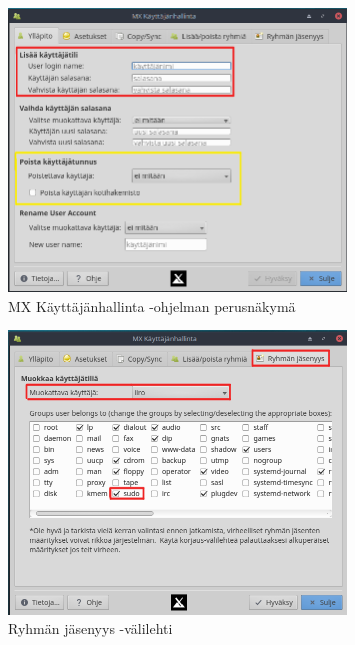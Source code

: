 \documentclass[a4paper, 12pt, finnish]{article}
\begin{document}
\begin{figure}[htpb]
    \begin{center}
        \includegraphics[width=0.8\textwidth]{user/nakyma}
        \caption{MX Käyttäjänhallinta -ohjelman perusnäkymä}
        \label{fig:usernak}
    \end{center}
\end{figure}
\begin{figure}[htpb]
    \begin{center}
        \includegraphics[width=0.8\textwidth]{user/group}
        \caption{Ryhmän jäsenyys -välilehti}
        \label{fig:group}
    \end{center}
\end{figure}
\end{document}
